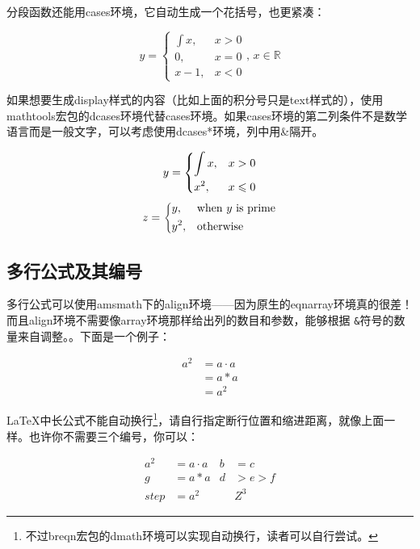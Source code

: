 {分段函数还能用cases环境，它自动生成一个花括号，也更紧凑：

\begin{codeshow}
\[y=\begin{cases}
\int x, & x>0 \\
0,   & x=0 \\
x-1, & x<0
\end{cases},\,
x\in\mathbb{R}\]
\end{codeshow}

如果想要生成display样式的内容（比如上面的积分号只是text样式的），使用mathtools宏包的dcases环境代替cases环境。如果cases环境的第二列条件不是数学语言而是一般文字，可以考虑使用dcases*环境，列中用\&{}隔开。

\begin{codeshow}
\[y=\begin{dcases}
  \int x, & x>0 \\
  x^2, & x\leqslant 0
  \end{dcases}\]
\[z=\begin{dcases*}
  y, & when $y$ is prime\\
  y^2, & otherwise
  \end{dcases*}\]
\end{codeshow}

\subsection{多行公式及其编号}
多行公式可以使用amsmath下的align环境——因为原生的eqnarray环境真的很差！而且align环境不需要像array环境那样给出列的数目和参数，能够根据
\texttt{\&}符号的数量来自调整。。下面是一个例子：

\begin{codeshow}
\begin{align}
  a^2  &= a\cdot a \\
       &= a*a      \\
       &= a^2
\end{align}
\end{codeshow}

\LaTeX 中长公式不能自动换行\footnote{不过breqn宏包的dmath环境可以实现自动换行，读者可以自行尝试。}，请自行指定断行位置和缩进距离，就像上面一样。也许你不需要三个编号，你可以：

\begin{codeshow}
\begin{align}
  a^2&= a\cdot a& b&=c\nonumber\\
  g  &= a*a & d&>e>f  \nonumber\\
  step&= a^2 & &Z^3
\end{align}
\end{codeshow}

}
